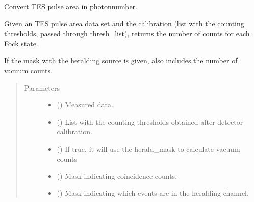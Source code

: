 \documentclass[letterpaper,10pt,english]{sphinxmanual}
\begin{document}
\begin{fulllineitems}
\label{\detokenize{tes:tes.counts.counting_photons}}
\sphinxAtStartPar
Convert TES pulse area in photon\sphinxhyphen{}number.

\sphinxAtStartPar
Given an TES pulse area data set and the calibration (list with the
counting thresholds, passed through thresh\_list), returns
the number of counts for each Fock state.

\sphinxAtStartPar
If the mask with the heralding source is given, also includes
the number of vacuum counts.
\begin{quote}\begin{description}
\item[{Parameters}] \leavevmode\begin{itemize}
\item {} 
\sphinxAtStartPar
{} () \textendash{} Measured data.

\item {} 
\sphinxAtStartPar
{} () \textendash{} List with the counting thresholds obtained after detector
calibration.

\item {} 
\sphinxAtStartPar
{} () \textendash{} If true, it will use the herald\_mask to calculate vacuum
counts

\item {} 
\sphinxAtStartPar
{} (\sphinxstyleliteralemphasis{\sphinxupquote{, }}) \textendash{} Mask indicating coincidence counts.

\item {} 
\sphinxAtStartPar
{} (\sphinxstyleliteralemphasis{\sphinxupquote{, }}) \textendash{} Mask indicating which events are in the heralding channel.


\end{itemize}
\end{description}
\end{quote}
\end{fulllineitems}
\end{document}

